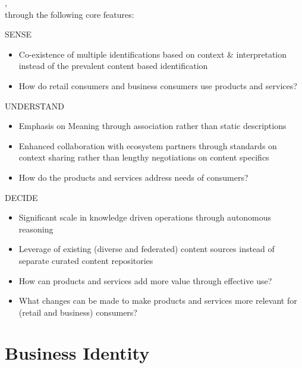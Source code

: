 ,\\
through the following core features:

\begin{basedescript}{%
    \desclabelstyle{\multilinelabel}
    \desclabelwidth{2.6cm}
}
    \item[SENSE]
        \begin{itemize}
            \item Co-existence of multiple identifications based on context \& interpretation instead of
                  the prevalent content based identification
            \item How do retail consumers and business consumers use products and services?
        \end{itemize}
    \item[UNDERSTAND]
        \begin{itemize}
            \item Emphasis on Meaning through association rather than static descriptions
            \item Enhanced collaboration with ecosystem partners through standards on context sharing
                  rather than lengthy negotiations on content specifics
            \item How do the products and services address needs of consumers?
        \end{itemize}
    \item[DECIDE]
        \begin{itemize}
            \item Significant scale in knowledge driven operations through autonomous reasoning
            \item Leverage of existing (diverse and federated) content sources instead of
                  separate curated content repositories
            \item How can products and services add more value through effective use?
            \item What changes can be made to make products and services more relevant
                  for (retail and business) consumers?
        \end{itemize}
\end{basedescript}

\section*{Business Identity}
\label{sec:ekg-mm-business-identity}

